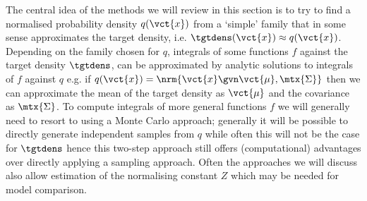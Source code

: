 
The central idea of the methods we will review in this section is to try to find a normalised probability density $q(\vct{x})$ from a `simple' family that in some sense approximates the target density, i.e. $\tgtdens(\vct{x}) \approx q(\vct{x})$. Depending on the family chosen for $q$, integrals of some functions $f$ against the target density $\tgtdens$, can be approximated by analytic solutions to integrals of $f$ against $q$ e.g. if $q(\vct{x}) = \nrm{\vct{x} \gvn \vct{\mu},\mtx{\Sigma}}$ then we can approximate the mean of the target density as $\vct{\mu}$ and the covariance as $\mtx{\Sigma}$. To compute integrals of more general functions $f$ we will generally need to resort to using a Monte Carlo approach; generally it will be possible to directly generate independent samples from $q$ while often this will not be the case for $\tgtdens$ hence this two-step approach still offers (computational) advantages over directly applying a sampling approach. Often the approaches we will discuss also allow estimation of the normalising constant $Z$ which may be needed for model comparison.

